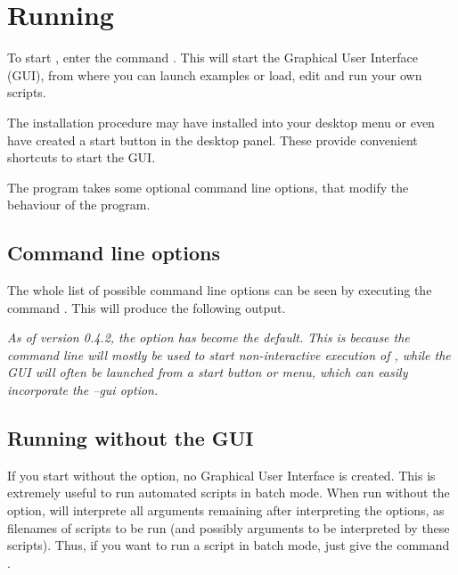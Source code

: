 \section{Running \pyf}
\label{sec:running}
To start \pyf, enter the command . This will start the \pyf Graphical User Interface (GUI), from where you can launch examples or load, edit and run your own \pyf scripts.

The installation procedure may have installed \pyf into your desktop menu or even have created a start button in the desktop panel. These provide convenient shortcuts to start the \pyf GUI.

The \pyf program takes some optional command line options, that modify the behaviour of the program.

\subsection{Command line options}
The whole list of possible command line options can be seen by executing the command . This will produce the following output.


\emph{As of version 0.4.2, the option has become the default. This is because the command line will mostly be used to start non-interactive execution of \pyf, while the GUI will often be launched from a start button or menu, which can easily incorporate the --gui option. 
}
\subsection{Running \pyFormex without the GUI}
If you start \pyf without the  option, no Graphical User Interface is created. This is extremely useful to run automated scripts in batch mode. When run without the  option, \pyf will interprete all arguments remaining after interpreting the options, as filenames of scripts to be run (and possibly arguments to be interpreted by these scripts).
Thus, if you want to run a \pyf script  in batch mode, just give the command .
 

